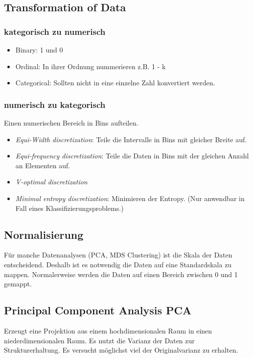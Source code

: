 \documentclass[a4paper]{scrartcl}
\begin{document}
\subsection{Transformation of Data}
\subsubsection{kategorisch zu numerisch}
\begin{itemize}
\item Binary: 1 und 0
\item Ordinal: In ihrer Ordnung nummerieren z.B. 1 - k
\item Categorical: Sollten nicht in eine einzelne Zahl konvertiert werden.
\end{itemize}

\subsubsection{numerisch zu kategorisch}
Einen numerischen Bereich in Bins aufteilen.
\begin{itemize}
\item \textit{Equi-Width discretization}: Teile die Intervalle in Bins mit gleicher Breite auf.
\item \textit{Equi-frequency discretization}: Teile die Daten in Bins mit der gleichen Anzahl an Elementen auf.
\item \textit{V-optimal discretization}
\item \textit{Minimal entropy discretization}: Minimieren der Entropy. (Nur anwendbar in Fall eines Klassifizierungsproblems.)
\end{itemize}

\subsection{Normalisierung}
Für manche Datenanalysen (PCA, MDS Clustering) ist die Skala der Daten entscheidend. Deshalb ist es notwendig die Daten auf eine Standardskala zu mappen. Normalerweise werden die Daten auf einen Bereich zwischen 0 und 1 gemappt.

\subsection{Principal Component Analysis PCA}
Erzeugt eine Projektion aus einem hochdimensionalen Raum in einen niederdimensionalen Raum. Es nutzt die Varianz der Daten zur Strukturerhaltung. Es versucht möglichst viel der Originalvarianz zu erhalten.
\end{document}
